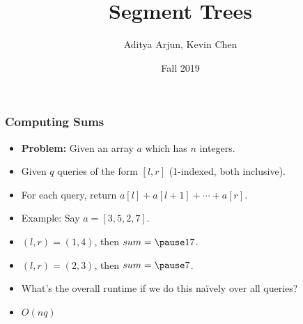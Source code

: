 \documentclass[t,handout]{beamer}
\title{Segment Trees}
\author{Aditya Arjun, Kevin Chen}
\institute{CS 104C}
\date{Fall 2019}
\begin{document}
 
\frame{\titlepage}
 
\begin{frame}

    \frametitle{Computing Sums}

    \begin{itemize}
        \item \textbf{Problem: } Given an array $a$ which has $n$ integers. 
        
        \pause
        
        \item Given $q$ queries of the form $[l, r]$ (1-indexed, both inclusive).
        
        \pause
        
        \item For each query, return $a[l] + a[l + 1] + \cdots + a[r]$.
    \end{itemize}
    
    \pause
    
    \begin{itemize}
        \item Example: Say $a = [3, 5, 2, 7]$.
        
        \pause
        
        \item $(l, r) = (1, 4)$, then $sum = \pause 17$.
        
        \pause
        
        \item $(l, r) = (2, 3)$, then $sum = \pause 7$.
        
        \pause
        
        \item What's the overall runtime if we do this na\"ively over all queries?
        
        \pause
        
        \item $O(nq)$
    \end{itemize}

\end{frame}
\end{document}
